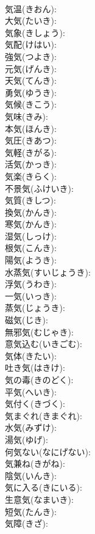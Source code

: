 \documentclass[8pt]{extreport}
\begin{document}
\begin{CJK}{UTF8}{min}
\\	気温(きおん): 
\\	大気(たいき): 
\\	気象(きしょう): 
\\	気配(けはい): 
\\	強気(つよき): 
\\	元気(げんき): 
\\	天気(てんき): 
\\	勇気(ゆうき): 
\\	気候(きこう): 
\\	気味(きみ): 
\\	本気(ほんき): 
\\	気圧(きあつ): 
\\	気軽(きがる): 
\\	活気(かっき): 
\\	気楽(きらく): 
\\	不景気(ふけいき): 
\\	気質(きしつ): 
\\	換気(かんき): 
\\	寒気(かんき): 
\\	湿気(しっけ): 
\\	根気(こんき): 
\\	陽気(ようき): 
\\	水蒸気(すいじょうき): 
\\	浮気(うわき): 
\\	一気(いっき): 
\\	蒸気(じょうき): 
\\	磁気(じき): 
\\	無邪気(むじゃき): 
\\	意気込む(いきごむ): 
\\	気体(きたい): 
\\	吐き気(はきけ): 
\\	気の毒(きのどく): 
\\	平気(へいき): 
\\	気付く(きづく): 
\\	気まぐれ(きまぐれ): 
\\	水気(みずけ): 
\\	湯気(ゆげ): 
\\	何気ない(なにげない): 
\\	気兼ね(きがね): 
\\	陰気(いんき): 
\\	気に入る(きにいる): 
\\	生意気(なまいき): 
\\	短気(たんき): 
\\	気障(きざ): 

\end{CJK}
\end{document}
